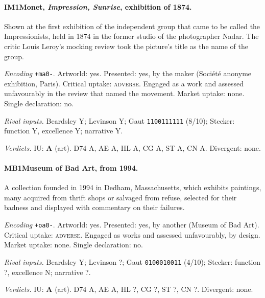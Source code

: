 \paragraph{IM1\enspace Monet, \emph{Impression, Sunrise}, exhibition of 1874.}
Shown at the first exhibition of the independent group that came to be called the Impressionists, held in 1874 in the former studio of the photographer Nadar. The critic Louis Leroy's mocking review took the picture's title as the name of the group.\par
\noindent\textit{Encoding} \texttt{+ma0-}. Artworld: yes. Presented: yes, by the maker (Soci\'et\'e anonyme exhibition, Paris). Critical uptake: \textsc{adverse}. Engaged as a work and assessed unfavourably in the review that named the movement. Market uptake: none. Single declaration: no.\par
\noindent\textit{Rival inputs.} Beardsley Y; Levinson Y; Gaut \texttt{1100111111} (8/10); Stecker: function Y, excellence Y; narrative Y.\par
\noindent\textit{Verdicts.} IU: \textbf{A} (art). D74 A, AE A, HL A, CG A, ST A, CN A. Divergent: none.\par

\paragraph{MB1\enspace Museum of Bad Art, from 1994.}
A collection founded in 1994 in Dedham, Massachusetts, which exhibits paintings, many acquired from thrift shops or salvaged from refuse, selected for their badness and displayed with commentary on their failures.\par
\noindent\textit{Encoding} \texttt{+oa0-}. Artworld: yes. Presented: yes, by another (Museum of Bad Art). Critical uptake: \textsc{adverse}. Engaged as works and assessed unfavourably, by design. Market uptake: none. Single declaration: no.\par
\noindent\textit{Rival inputs.} Beardsley Y; Levinson ?; Gaut \texttt{0100010011} (4/10); Stecker: function ?, excellence N; narrative ?.\par
\noindent\textit{Verdicts.} IU: \textbf{A} (art). D74 A, AE A, HL ?, CG ?, ST ?, CN ?. Divergent: none.\par

